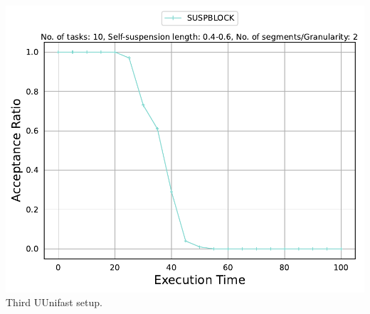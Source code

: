\documentclass[]{article}
\begin{document}
\begin{minipage}[t]{0.48\linewidth}
		\includegraphics[width=\linewidth]{SUSPBLOCK[2][0.4-0.6][10].pdf}
		Third UUnifast setup.
		\vspace{0.3cm}
		
		
	\end{minipage}\hfill
\end{document}
